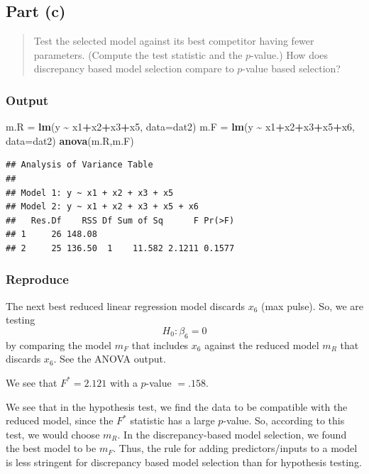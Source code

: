 \documentclass[
]{article}
\newenvironment{Shaded}{\begin{snugshade}}{\end{snugshade}}
\newcommand{\AttributeTok}[1]{\textcolor[rgb]{0.13,0.29,0.53}{#1}}
\newcommand{\FunctionTok}[1]{\textcolor[rgb]{0.13,0.29,0.53}{\textbf{#1}}}
\newcommand{\NormalTok}[1]{#1}
\newcommand{\OtherTok}[1]{\textcolor[rgb]{0.56,0.35,0.01}{#1}}
\newcommand{\SpecialCharTok}[1]{\textcolor[rgb]{0.81,0.36,0.00}{\textbf{#1}}}
\begin{document}
\hypertarget{part-c-1}{%
\subsection{Part (c)}\label{part-c-1}}

\begin{quote}
Test the selected model against its best competitor having fewer
parameters. (Compute the test statistic and the \(p\)-value.) How does
discrepancy based model selection compare to \(p\)-value based
selection?
\end{quote}

\hypertarget{output-9}{%
\subsubsection{Output}\label{output-9}}

\begin{Shaded}
\begin{Highlighting}[]
\NormalTok{m.R }\OtherTok{=} \FunctionTok{lm}\NormalTok{(y }\SpecialCharTok{\textasciitilde{}}\NormalTok{ x1}\SpecialCharTok{+}\NormalTok{x2}\SpecialCharTok{+}\NormalTok{x3}\SpecialCharTok{+}\NormalTok{x5, }\AttributeTok{data=}\NormalTok{dat2)}
\NormalTok{m.F }\OtherTok{=} \FunctionTok{lm}\NormalTok{(y }\SpecialCharTok{\textasciitilde{}}\NormalTok{ x1}\SpecialCharTok{+}\NormalTok{x2}\SpecialCharTok{+}\NormalTok{x3}\SpecialCharTok{+}\NormalTok{x5}\SpecialCharTok{+}\NormalTok{x6, }\AttributeTok{data=}\NormalTok{dat2)}
\FunctionTok{anova}\NormalTok{(m.R,m.F)}
\end{Highlighting}
\end{Shaded}

\begin{verbatim}
## Analysis of Variance Table
## 
## Model 1: y ~ x1 + x2 + x3 + x5
## Model 2: y ~ x1 + x2 + x3 + x5 + x6
##   Res.Df    RSS Df Sum of Sq      F Pr(>F)
## 1     26 148.08                           
## 2     25 136.50  1    11.582 2.1211 0.1577
\end{verbatim}

\hypertarget{reproduce-13}{%
\subsubsection{Reproduce}\label{reproduce-13}}

The next best reduced linear regression model discards \(x_6\) (max
pulse). So, we are testing \[
  H_0 : \beta_6 = 0
\] by comparing the model \(m_F\) that includes \(x_6\) against the
reduced model \(m_R\) that discards \(x_6\). See the ANOVA output.

We see that \(F^* = 2.121\) with a \(p\)-value \(= .158\).

We see that in the hypothesis test, we find the data to be compatible
with the reduced model, since the \(F^*\) statistic has a large
\(p\)-value. So, according to this test, we would choose \(m_R\). In the
discrepancy-based model selection, we found the best model to be
\(m_F\). Thus, the rule for adding predictors/inputs to a model is less
stringent for discrepancy based model selection than for hypothesis
testing.
\end{document}

